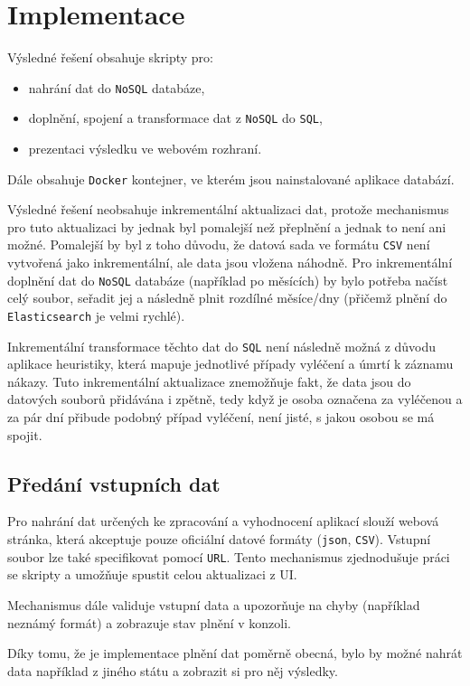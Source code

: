 \documentclass[11pt,a4paper,titlepage]{article}
\begin{document}
\newpage
\section{Implementace}
Výsledné řešení obsahuje skripty pro:
\begin{itemize}
    \item nahrání dat do \texttt{NoSQL} databáze,
    \item doplnění, spojení a transformace dat z \texttt{NoSQL} do \texttt{SQL},
    \item prezentaci výsledku ve webovém rozhraní. 
\end{itemize}
Dále obsahuje \texttt{Docker}\cite{docker} kontejner, ve kterém jsou nainstalované aplikace databází.

Výsledné řešení neobsahuje inkrementální aktualizaci dat, protože mechanismus pro tuto aktualizaci by jednak byl pomalejší než přeplnění a jednak to není ani možné.
Pomalejší by byl z toho důvodu, že datová sada ve formátu \texttt{CSV} není vytvořená jako inkrementální, ale data jsou vložena náhodně. Pro inkrementální doplnění dat do \texttt{NoSQL} databáze (například po měsících) by bylo potřeba načíst celý soubor, seřadit jej a následně plnit rozdílné měsíce/dny (přičemž plnění do \texttt{Elasticsearch} je velmi rychlé).

Inkrementální transformace těchto dat do \texttt{SQL} není následně možná z důvodu aplikace heuristiky, která mapuje jednotlivé případy vyléčení a úmrtí k záznamu nákazy. Tuto inkrementální aktualizace znemožňuje fakt, že data jsou do datových souborů přidávána i zpětně, tedy když je osoba označena za vyléčenou a za pár dní přibude podobný případ vyléčení, není jisté, s jakou osobou se má spojit.


\subsection{Předání vstupních dat}
Pro nahrání dat určených ke zpracování a vyhodnocení aplikací slouží webová stránka, která akceptuje pouze oficiální datové formáty (\texttt{json}, \texttt{CSV}). Vstupní soubor lze také specifikovat pomocí \texttt{URL}. Tento mechanismus zjednodušuje práci se skripty a umožňuje spustit celou aktualizaci z UI. 

Mechanismus dále validuje vstupní data a upozorňuje na chyby (například neznámý formát) a zobrazuje stav plnění v konzoli.

Díky tomu, že je implementace plnění dat poměrně obecná, bylo by možné nahrát data například z jiného státu a zobrazit si pro něj výsledky.
\end{document}
